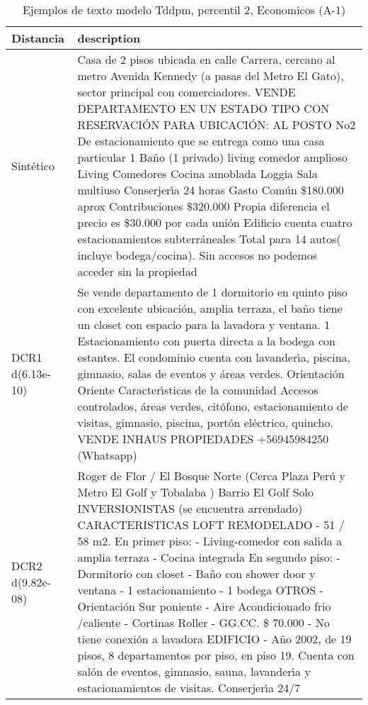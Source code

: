 \begin{table}[H]
\centering
\fontsize{10}{14}\selectfont
\caption{Ejemplos de texto modelo Tddpm, percentil 2, Economicos (A-1)}
\label{table-example-economicos-a-1-tddpm_mlp-2p-text}
\begin{tabular}{|l|m{35em}|}
\hline
\rowcolor[gray]{0.8}
Distancia & description \\
\hline Sintético & Casa de 2 pisos ubicada en calle Carrera, cercano al metro Avenida Kennedy (a pasas del Metro El Gato), sector principal con comerciadores. VENDE DEPARTAMENTO EN UN ESTADO TIPO CON RESERVACI\'ON PARA UBICACI\'ON: AL POSTO No2 De estacionamiento que se entrega como una casa particular 1 Ba\~no (1 privado) living comedor amplioso Living Comedores Cocina amoblada Loggia Sala multiuso Conserjer{\'\i}a 24 horas Gasto Com\'un \$180.000 aprox Contribuciones \$320.000 Propia diferencia el precio es \$30.000 por cada uni\'on Edificio cuenta cuatro estacionamientos subterr\'aneales Total para 14 autos( incluye bodega/cocina). Sin accesos no podemos acceder sin la propiedad \\
\hline DCR1 d(6.13e-10) & Se vende departamento de 1 dormitorio en quinto piso con excelente ubicaci\'on, amplia terraza, el ba\~no tiene un closet con espacio para la lavadora y ventana.  1 Estacionamiento con puerta directa a la bodega con estantes. El condominio cuenta con lavander{\'\i}a, piscina, gimnasio, salas de eventos y \'areas verdes. Orientaci\'on Oriente  Caracter{\'\i}sticas de la comunidad Accesos controlados, \'areas verdes, cit\'ofono, estacionamiento de visitas, gimnasio, piscina, port\'on el\'ectrico, quincho.  VENDE INHAUS PROPIEDADES +56945984250 (Whatsapp) \\
\hline DCR2 d(9.82e-08) & Roger de Flor / El Bosque Norte (Cerca Plaza Per\'u y Metro El Golf y Tobalaba ) Barrio El Golf Solo INVERSIONISTAS (se encuentra arrendado)  CARACTERISTICAS LOFT REMODELADO - 51 / 58 m2. En primer piso: - Living-comedor con salida a amplia terraza  - Cocina integrada En segundo piso: - Dormitorio con closet - Ba\~no con shower door y ventana - 1 estacionamiento - 1 bodega  OTROS - Orientaci\'on Sur poniente - Aire Acondicionado frio /caliente - Cortinas Roller - GG.CC. \$ 70.000 - No tiene conexi\'on a lavadora  EDIFICIO - A\~no 2002, de 19 pisos, 8 departamentos por piso, en piso 19. Cuenta con sal\'on de eventos, gimnasio, sauna, lavander{\'\i}a y estacionamientos de visitas. Conserjer{\'\i}a 24/7 \\
\hline
\end{tabular}
\end{table}
